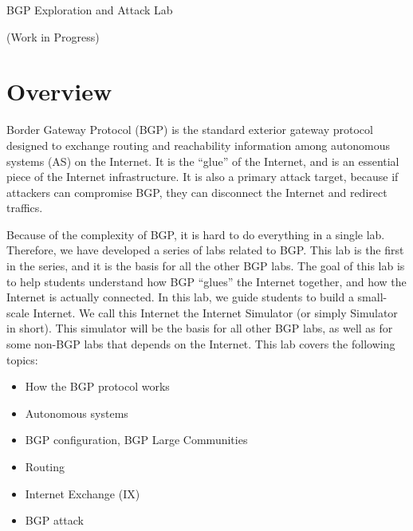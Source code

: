 
\newcommand{\commonfolder}{../../common-files}





\newcommand{\bgpFigs}{./Figs}




\begin{center}
{\LARGE BGP Exploration and Attack Lab}

  \vspace{0.1in}
  {\LARGE (Work in Progress)}
\end{center}


\tableofcontents




\section{Overview}

Border Gateway Protocol (BGP) is the standard exterior gateway protocol
designed to exchange routing and reachability information among autonomous
systems (AS) on the Internet. It is the ``glue'' of the Internet,
and is an essential piece of the Internet infrastructure. It is 
also a primary attack target, because if attackers can 
compromise BGP, they can disconnect the Internet and redirect traffics. 

Because of the complexity of BGP, it is hard to do everything in a single lab. 
Therefore, we have developed a series of labs related to BGP. This lab
is the first in the series, and it is the basis for all the other BGP labs.  
The goal of this lab is to help students understand how
BGP ``glues'' the Internet together, and how the Internet is actually
connected. In this lab, we guide students to build a small-scale Internet.
We call this Internet the Internet Simulator (or simply
Simulator in short). This simulator will be the basis for 
all other BGP labs, as well as for some non-BGP labs that 
depends on the Internet. 
This lab covers the following topics:
\begin{itemize}[noitemsep]
\item How the BGP protocol works
\item Autonomous systems
\item BGP configuration, BGP Large Communities 
\item Routing 
\item Internet Exchange (IX)
\item BGP attack
\end{itemize}


